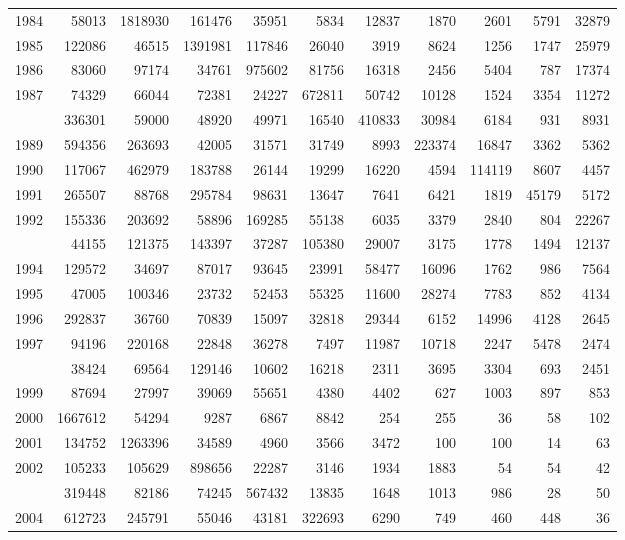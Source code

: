 \documentclass[
]{article}
\begin{document}
\begin{longtable}[t]{lrrrrrrrrrr}
1984 & 58013 & 1818930 & 161476 & 35951 & 5834 & 12837 & 1870 & 2601 & 5791 & 32879\\
1985 & 122086 & 46515 & 1391981 & 117846 & 26040 & 3919 & 8624 & 1256 & 1747 & 25979\\
1986 & 83060 & 97174 & 34761 & 975602 & 81756 & 16318 & 2456 & 5404 & 787 & 17374\\
1987 & 74329 & 66044 & 72381 & 24227 & 672811 & 50742 & 10128 & 1524 & 3354 & 11272\\
\addlinespace
1988 & 336301 & 59000 & 48920 & 49971 & 16540 & 410833 & 30984 & 6184 & 931 & 8931\\
1989 & 594356 & 263693 & 42005 & 31571 & 31749 & 8993 & 223374 & 16847 & 3362 & 5362\\
1990 & 117067 & 462979 & 183788 & 26144 & 19299 & 16220 & 4594 & 114119 & 8607 & 4457\\
1991 & 265507 & 88768 & 295784 & 98631 & 13647 & 7641 & 6421 & 1819 & 45179 & 5172\\
1992 & 155336 & 203692 & 58896 & 169285 & 55138 & 6035 & 3379 & 2840 & 804 & 22267\\
\addlinespace
1993 & 44155 & 121375 & 143397 & 37287 & 105380 & 29007 & 3175 & 1778 & 1494 & 12137\\
1994 & 129572 & 34697 & 87017 & 93645 & 23991 & 58477 & 16096 & 1762 & 986 & 7564\\
1995 & 47005 & 100346 & 23732 & 52453 & 55325 & 11600 & 28274 & 7783 & 852 & 4134\\
1996 & 292837 & 36760 & 70839 & 15097 & 32818 & 29344 & 6152 & 14996 & 4128 & 2645\\
1997 & 94196 & 220168 & 22848 & 36278 & 7497 & 11987 & 10718 & 2247 & 5478 & 2474\\
\addlinespace
1998 & 38424 & 69564 & 129146 & 10602 & 16218 & 2311 & 3695 & 3304 & 693 & 2451\\
1999 & 87694 & 27997 & 39069 & 55651 & 4380 & 4402 & 627 & 1003 & 897 & 853\\
2000 & 1667612 & 54294 & 9287 & 6867 & 8842 & 254 & 255 & 36 & 58 & 102\\
2001 & 134752 & 1263396 & 34589 & 4960 & 3566 & 3472 & 100 & 100 & 14 & 63\\
2002 & 105233 & 105629 & 898656 & 22287 & 3146 & 1934 & 1883 & 54 & 54 & 42\\
\addlinespace
2003 & 319448 & 82186 & 74245 & 567432 & 13835 & 1648 & 1013 & 986 & 28 & 50\\
2004 & 612723 & 245791 & 55046 & 43181 & 322693 & 6290 & 749 & 460 & 448 & 36\\

\end{longtable}
\end{document}
